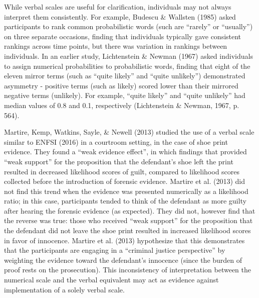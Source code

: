 \documentclass[print]{nuthesis}
\begin{document}
While verbal scales are useful for clarification, individuals may not always interpret them consistently.
For example, Budescu \& Wallsten (1985) asked participants to rank common probabilistic words (such are ``rarely'' or ``usually'') on three separate occasions, finding that individuals typically gave consistent rankings across time points, but there was variation in rankings between individuals.
In an earlier study, Lichtenstein \& Newman (1967) asked individuals to assign numerical probabilities to probabilistic words, finding that eight of the eleven mirror terms (such as ``quite likely'' and ``quite unlikely'') demonstrated asymmetry - positive terms (such as likely) scored lower than their mirrored negative terms (unlikely). For example, ``quite likely'' and ``quite unlikely'' had median values of 0.8 and 0.1, respectively (Lichtenstein \& Newman, 1967, p. 564).

Martire, Kemp, Watkins, Sayle, \& Newell (2013) studied the use of a verbal scale similar to ENFSI (2016) in a courtroom setting, in the case of shoe print evidence.
They found a ``weak evidence effect'', in which findings that provided ``weak support'' for the proposition that the defendant's shoe left the print resulted in decreased likelihood scores of guilt, compared to likelihood scores collected before the introduction of forensic evidence.
Martire et al. (2013) did not find this trend when the evidence was presented numerically as a likelihood ratio; in this case, participants tended to think of the defendant as more guilty after hearing the forensic evidence (as expected).
They did not, however find that the reverse was true: those who received ``weak support'' for the proposition that the defendant did not leave the shoe print resulted in increased likelihood scores in favor of innocence.
Martire et al. (2013) hypothesize that this demonstrates that the participants are engaging in a ``criminal justice perspective'' by weighting the evidence toward the defendant's innocence (since the burden of proof rests on the prosecution).
This inconsistency of interpretation between the numerical scale and the verbal equivalent may act as evidence against implementation of a solely verbal scale.
\end{document}
